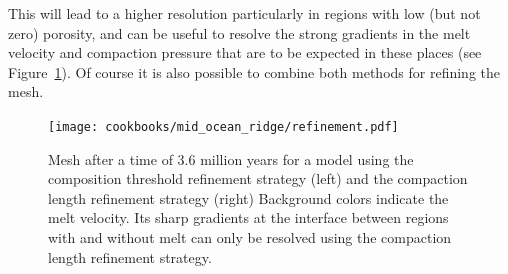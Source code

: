 \documentclass{article}
\begin{document}
This will lead to a higher resolution particularly in regions with low (but not zero) porosity, 
and can be useful to resolve the strong gradients in the melt velocity and compaction pressure that 
are to be expected in these places (see Figure~\ref{fig:mid-ocean-ridge-mesh}). 
Of course it is also possible to combine both methods for refining the mesh. 

\begin{figure}
    \centering
    \texttt{[image: cookbooks/mid\_ocean\_ridge/refinement.pdf]}
    \caption{Mesh after a time of 3.6 million years for a model using the composition threshold 
             refinement strategy (left) and the compaction length refinement strategy (right)
             Background colors indicate the melt velocity. Its sharp gradients at the interface 
             between regions with and without melt can only be resolved using the compaction 
             length refinement strategy.}
    \label{fig:mid-ocean-ridge-mesh}
\end{figure}
\end{document}
